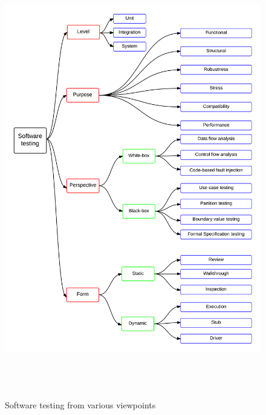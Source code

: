 \begin{figure}[H]
	\centering
	\centerline{\includegraphics[width=16cm, height=19cm]{chapter2/softwareTestingFlow.png}}
	\caption{Software testing from various viewpoints}
	\label{fig:softwareTestingFlow_2}
\end{figure}

